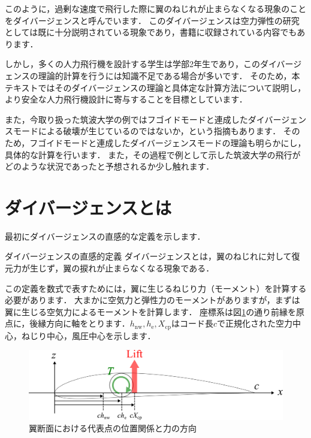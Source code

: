 \documentclass{jarticle}
\begin{document}
このように，過剰な速度で飛行した際に翼のねじれが止まらなくなる現象のことをダイバージェンスと呼んでいます．
このダイバージェンスは空力弾性の研究としては既に十分説明されている現象であり，書籍に収録されている内容でもあります\cite{2019}．

しかし，多くの人力飛行機を設計する学生は学部2年生であり，このダイバージェンスの理論的計算を行うには知識不足である場合が多いです．
そのため，本テキストではそのダイバージェンスの理論と具体定な計算方法について説明し，より安全な人力飛行機設計に寄与することを目標としています．

また，今取り扱った筑波大学の例ではフゴイドモードと連成したダイバージェンスモード\cite{takasaki}による破壊が生じているのではないか，という指摘もあります．
そのため，フゴイドモードと連成したダイバージェンスモードの理論も明らかにし，具体的な計算を行います．
また，その過程で例として示した筑波大学の飛行がどのような状況であったと予想されるか少し触れます．

\newpage

\section{ダイバージェンスとは}

最初にダイバージェンスの直感的な定義を示します．
\begin{itembox}[l]{ダイバージェンスの直感的定義}
    ダイバージェンスとは，翼のねじれに対して復元力が生じず，翼の捩れが止まらなくなる現象である．
\end{itembox}

この定義を数式で表すためには，翼に生じるねじり力（モーメント）を計算する必要があります．
大まかに空気力と弾性力のモーメントがありますが，まずは翼に生じる空気力によるモーメントを計算します．
座標系は図\ref{chod}の通り前縁を原点に，後縁方向に軸をとります．$h_\mathrm{nw},h_\mathrm{e},X_\mathrm{cp}$はコード長$c$で正規化された空力中心，ねじり中心，風圧中心を示します．
\begin{figure}[H]
    \centering
    \includegraphics[width=0.7\linewidth]{image/airfoil.pdf}
    \caption{翼断面における代表点の位置関係と力の方向}
    \label{chod}
\end{figure}
\end{document}
